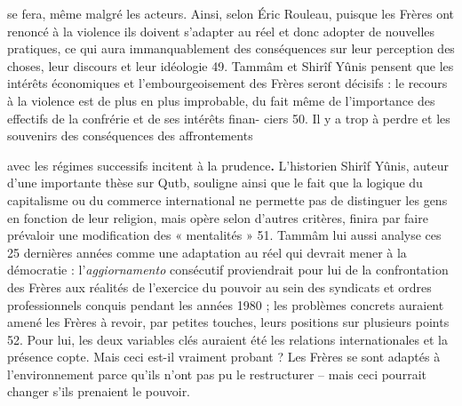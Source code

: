 se fera, même malgré les acteurs. Ainsi, selon Éric Rouleau, puisque les
Frères ont renoncé à la violence ils doivent s'adapter au réel et donc
adopter de nouvelles pratiques, ce qui aura immanquablement des
conséquences sur leur perception des choses, leur discours et leur
idéologie 49. Tammâm et Shirîf Yûnis pensent que les intérêts
économiques et l'embourgeoisement des Frères seront décisifs : le
recours à la violence est de plus en plus improbable, du fait même de
l'importance des effectifs de la confrérie et de ses intérêts finan-
ciers 50. Il y a trop à perdre et les souvenirs des conséquences des
affrontements

avec les régimes successifs incitent à la prudence\textbf{.} L'historien
Shirîf Yûnis, auteur d'une importante thèse sur Qutb, souligne ainsi que
le fait que la logique du capitalisme ou du commerce international ne
permette pas de distinguer les gens en fonction de leur religion, mais
opère selon d'autres critères, finira par faire prévaloir une
modification des « mentalités » 51. Tammâm lui aussi analyse ces 25
dernières années comme une adaptation au réel qui devrait mener à la
démocratie : l'\emph{aggiornamento} consécutif proviendrait pour lui de
la confrontation des Frères aux réalités de l'exercice du pouvoir au
sein des syndicats et ordres professionnels conquis pendant les années
1980 ; les problèmes concrets auraient amené les Frères à revoir, par
petites touches, leurs positions sur plusieurs points 52. Pour lui, les
deux variables clés auraient été les relations internationales et la
présence copte. Mais ceci est-il vraiment probant ? Les Frères se sont
adaptés à l'environnement parce qu'ils n'ont pas pu le restructurer --
mais ceci pourrait changer s'ils prenaient le pouvoir.

